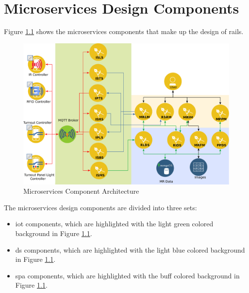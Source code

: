 \chapter{Microservices Design Components}
Figure \ref{fig:microarchitecture} shows the microservices components that make up the design of \gls{rails}.

\begin{figure}[H]
	\centering
		\includegraphics[scale=0.7]{design.eps}
	\caption{Microservices Component Architecture}
	\label{fig:microarchitecture}
\end{figure}

The microservices design components are divided into three sets:
\begin{itemize}
  \item \gls{iot} components, which are highlighted with the light green colored background in Figure \ref{fig:microarchitecture}.
  \item \gls{ds} components, which are highlighted with the light blue colored background in Figure \ref{fig:microarchitecture}.
  \item \gls{spa} components, which are highlighted with the buff colored background in Figure \ref{fig:microarchitecture}.
\end{itemize}

